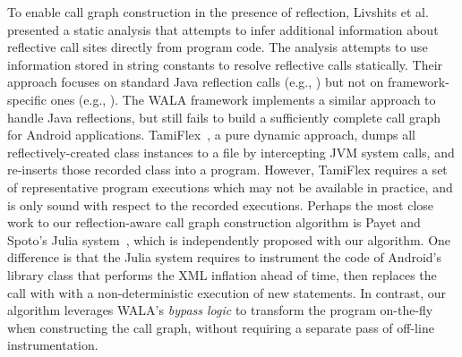 To enable call graph construction in the presence of  reflection,
Livshits et al.~\cite{Livshits:2005} presented a static analysis
that attempts to infer additional information about
reflective call sites directly from program code. The analysis
attempts to use information stored in string constants to resolve
reflective calls statically. Their approach focuses on standard Java
reflection calls (e.g., ) but not on
framework-specific ones (e.g., ).
The WALA framework implements a similar approach to handle Java
reflections, but still fails to build a sufficiently complete call graph for
Android applications. TamiFlex~\cite{Bodden:2011}, a pure dynamic
approach, dumps all reflectively-created class instances to a file
by intercepting JVM system calls, and re-inserts those recorded 
class into a program. However, TamiFlex requires a set of representative
program executions which may not be available in practice,
 and is only sound with respect to the recorded executions.
Perhaps the most close work to our reflection-aware call graph
construction algorithm is Payet and Spoto's Julia
system~\cite{Payet:2011:SAA:2032266.2032299}, which is independently
proposed with our algorithm. One difference is that the Julia system
requires to instrument the code of Android's library class
 that performs the XML inflation ahead of time,
then replaces the  call with with a
non-deterministic execution of new statements.
In contrast, our algorithm leverages WALA's \textit{bypass logic}
to transform the program on-the-fly when
constructing the call graph, without requiring a separate pass of
off-line instrumentation.







 
